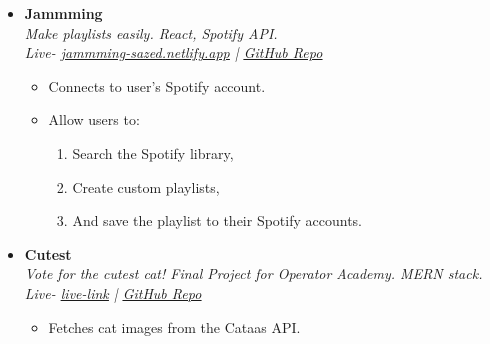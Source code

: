 \documentclass[11pt, oneside, a4paper, titlepage]{article}
\newcommand\experienceVSpace{\vspace{-0.1cm}}
\begin{document}
\begin{tcolorbox}
\begin{minipage}[t]{11cm}
\begin{tcolorbox}[grow to right by=0.75cm,colframe=white,colback=white]
\begin{itemize}
        \item
        {
          \textbf{Jammming} \\
          \textit{Make playlists easily. React, Spotify API.} \\
          \textit{Live-  \href{https://jammming-sazed.netlify.app}{\underline{jammming-sazed.netlify.app}} | \href{https://github.com/SazedWorldbringer/codecademy-jammming}{\underline{GitHub Repo}}} \\
          \vspace*{-0.7cm}
          \begin{itemize}
            \item Connects to user's Spotify account.
              \experienceVSpace
            \item {Allow users to:
                \vspace{-0.2cm}
                \begin{enumerate} 
                  \item{Search the Spotify library,}
                    \vspace{-0.2cm}
                  \item{Create custom playlists,} 
                    \vspace{-0.2cm}
                  \item{And save the playlist to their Spotify accounts.}
                \end{enumerate}
              }
          \end{itemize}
        }

        \item
        {
          \textbf{Cutest} \\
          \textit{Vote for the cutest cat! Final Project for Operator Academy. MERN stack.} \\
          \textit{Live- \href{url}{\underline{live-link}} | \href{https://github.com/SazedWorldbringer/operator-academy-final-project}{\underline{GitHub Repo}}} \\
          \vspace*{-0.7cm}
          \begin{itemize}
            \item Fetches cat images from the Cataas API.
          \end{itemize}
        }


\end{itemize}
\end{tcolorbox}
\end{minipage}
\end{tcolorbox}
\end{document}

